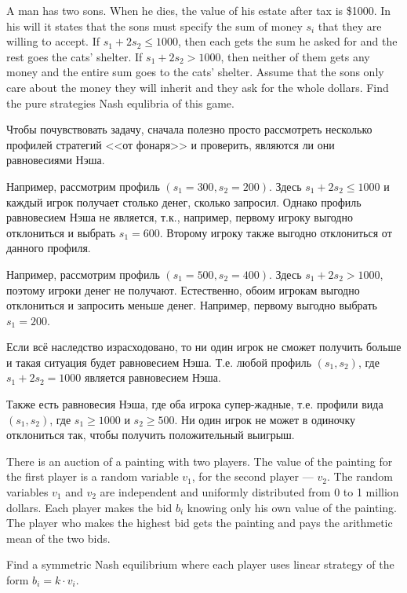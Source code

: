\begin{problem}
A man has two sons. When he dies, the value of his estate after tax is \$1000. In his will it states that the sons must specify the sum of money $s_i$ that they are willing to accept. If $s_1+2s_2\leq 1000$, then each gets the sum he asked for and the rest goes the cats’ shelter. If $s_1+2s_2> 1000$, then neither of them gets any money and the entire sum goes to the cats’ shelter. Assume that the sons only care about the money they will inherit and they ask for the whole dollars. Find the pure strategies Nash equlibria of this game.
\end{problem}

\begin{solution}
Чтобы почувствовать задачу, сначала полезно просто рассмотреть несколько профилей стратегий <<от фонаря>> и проверить, являются ли они равновесиями Нэша.

Например, рассмотрим профиль $(s_1=300,s_2=200)$. Здесь $s_1+2s_2\leq 1000$ и каждый игрок получает столько денег, сколько запросил. Однако профиль  равновесием Нэша не является, т.к., например, первому игроку выгодно отклониться и выбрать $s_1=600$.  Второму игроку также выгодно отклониться от данного профиля.

Например, рассмотрим профиль $(s_1=500,s_2=400)$. Здесь $s_1+2s_2>1000$, поэтому игроки денег не получают. Естественно, обоим игрокам выгодно отклониться и запросить меньше денег. Например, первому выгодно выбрать $s_1=200$. 

Если всё наследство израсходовано, то ни один игрок не сможет получить больше и такая ситуация будет равновесием Нэша. Т.е. любой профиль $(s_1,s_2)$, где  $s_1+2s_2=1000$ является равновесием Нэша.

Также есть равновесия Нэша, где оба игрока супер-жадные, т.е. профили вида $(s_1,s_2)$, где $s_1\geq 1000$ и $s_2 \geq 500$. Ни один игрок не может в одиночку отклониться так, чтобы получить положительный выигрыш.
\end{solution}

\begin{problem}
There is an auction of a painting with two players. The value of the painting for the first player is a random variable $v_1$, for the second player --- $v_2$. The random variables $v_1$ and $v_2$ are independent and uniformly distributed from 0 to 1 million dollars. Each player makes the bid $b_i$ knowing only his own value of the painting. The player who makes the highest bid gets the painting and pays the arithmetic mean of the two bids. 

Find a symmetric Nash equilibrium where each player uses linear strategy of the form $b_i=k\cdot v_i$.
\end{problem}


